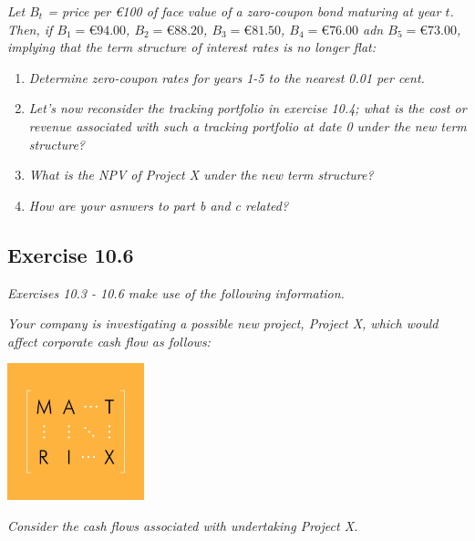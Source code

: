 \documentclass[]{book}
\newcommand{\euro}{€}
\theoremstyle{definition}
\theoremstyle{definition}
\theoremstyle{remark}
\begin{document}
\emph{Let \(B_t\) = price per \euro{}100 of face value of a zaro-coupon
bond maturing at year \(t\). Then, if \(B_1=€94.00\), \(B_2=€88.20\),
\(B_3=€81.50\), \(B_4=€76.00\) adn \(B_5=€73.00\), implying that the
term structure of interest rates is no longer flat:} \citep[p.339]{book}

\begin{enumerate}
\def\labelenumi{\alph{enumi}.}
\item
  \emph{Determine zero-coupon rates for years 1-5 to the nearest 0.01
  per cent.} \citep[p.339]{book}
\item
  \emph{Let's now reconsider the tracking portfolio in exercise 10.4;
  what is the cost or revenue associated with such a tracking portfolio
  at date 0 under the new term structure?} \citep[p.339]{book}
\item
  \emph{What is the NPV of Project X under the new term structure?}
  \citep[p.339]{book}
\item
  \emph{How are your asnwers to part b and c related?}
  \citep[p.339]{book}
\end{enumerate}

\subsection{Exercise 10.6}\label{exercise-10.6}

\emph{Exercises 10.3 - 10.6 make use of the following information.}
\citep[p.338]{book}

\emph{Your company is investigating a possible new project, Project X,
which would affect corporate cash flow as follows:} \citep[p.338]{book}

\begin{center}\includegraphics[width=150px]{figures/matrix} \end{center}

\emph{Consider the cash flows associated with undertaking Project X.}
\citep[p.339]{book}
\end{document}
